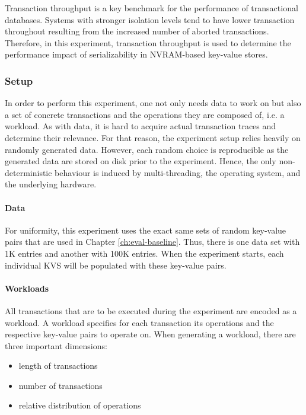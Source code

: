 Transaction throughput is a key benchmark for the performance of transactional
databases. Systems with stronger isolation levels tend to have lower transaction
throughout resulting from the increased number of aborted transactions.
Therefore, in this experiment, transaction throughput is used to determine the
performance impact of serializability in NVRAM-based key-value stores.

\subsubsection{Setup}

In order to perform this experiment, one not only needs data to work on but also
a set of concrete transactions and the operations they are composed of, i.e. a
workload. As with data, it is hard to acquire actual transaction traces and
determine their relevance. For that reason, the experiment setup relies heavily
on randomly generated data. However, each random choice is reproducible as the
generated data are stored on disk prior to the experiment. Hence, the only
non-deterministic behaviour is induced by multi-threading, the operating system,
and the underlying hardware.

\paragraph{Data}

For uniformity, this experiment uses the exact same sets of random key-value
pairs that are used in Chapter \ref{ch:eval-baseline}. Thus, there is one data
set with 1K entries and another with 100K entries. When the experiment starts,
each individual KVS will be populated with these key-value pairs.

\paragraph{Workloads}

All transactions that are to be executed during the experiment are encoded as a
workload. A workload specifies for each transaction its operations and the
respective key-value pairs to operate on. When generating a workload, there are
three important dimensions:

\begin{itemize}
    \item length of transactions
    \item number of transactions
    \item relative distribution of operations
\end{itemize}

